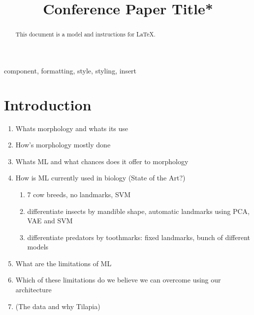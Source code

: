 \documentclass[conference]{IEEEtran}
\begin{document}
\title{Conference Paper Title*}

\author{
}

\maketitle

\begin{abstract}
This document is a model and instructions for \LaTeX.
\end{abstract}

\begin{IEEEkeywords}
component, formatting, style, styling, insert
\end{IEEEkeywords}

\section{Introduction}
\begin{enumerate}
    \item Whats morphology and whats its use
    \item How’s morphology mostly done \cite{morphometrics}
    \item Whats ML and what chances does it offer to morphology
    \item How is ML currently used in biology (State of the Art?)
    \begin{enumerate}
        \item 7 cow breeds, no landmarks, SVM \cite{cows}
        \item differentiate insects by mandible shape, automatic landmarks using PCA, VAE and SVM \cite{mandibleShape}
        \item differentiate predators by toothmarks: fixed landmarks, bunch of different models \cite{carnivores}
    \end{enumerate}
    \item What are the limitations of ML
    \item Which of these limitations do we believe  we can overcome using our architecture
    \item (The data and why Tilapia) \cite{Tilapia}

\end{enumerate}
\end{document}

